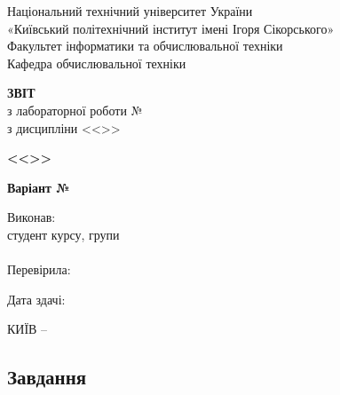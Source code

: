 \documentclass[14pt, a4paper]{extreport}
\begin{document}
	
	\begin{titlepage}
		\begin{center}
			\normalsize
			Національний технічний університет України\\
			«Київський політехнічний інститут імені Ігоря Сікорського» \\[0.5em]
			Факультет інформатики та обчислювальної техніки\\
			Кафедра обчислювальної техніки
			
			\vfill
			
			{\large \textbf{ЗВІТ}\\[0.5em]}
			{з лабораторної роботи №\LabNumber \\}
			{з дисципліни <<\CourseTitle>>}
			
			\vspace{2em}
			
			{\textbf{<<\Topic>>}}
			
			\vspace{1em}
			
			{\textbf{Варіант №\Variant}}
			
			\vfill
			
			\begin{flushright}
				Виконав: \\ студент \CourseNumber{} курсу, групи \StudentGroup \\
				\StudentName \\[1em]
				Перевірила: \\ \Teacher
			\end{flushright}
			
			\vfill
			
			\begin{flushright}
				Дата здачі: \DTMtoday
			\end{flushright}
			
			\vspace{5em}
			КИЇВ -- \ReportYear
		\end{center}
	\end{titlepage}
	
	\clearpage
	\setcounter{page}{2}
	
	\subsection*{Завдання}
	
\end{document}
